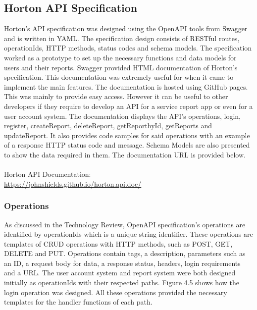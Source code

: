 \subsection{Horton API Specification}
Horton's API specification was designed using the OpenAPI tools from Swagger and is written in YAML. The specification design consists of RESTful routes, operationIds, HTTP methods, status codes and schema models. 
The specification worked as a prototype to set up the necessary functions and data models for users and their reports. 
Swagger provided HTML documentation of Horton's specification. This documentation was extremely useful for when it came to implement the main features. The documentation is hosted using GitHub pages. This was mainly to provide easy access. However it can be useful to other developers if they require to develop an API for a service report app or even for a user account system. The documentation displays the API's operations, login, register, createReport, deleteReport, getReportbyId, getReports and updateReport. It also provides code samples for said operations with an example of a response HTTP status code and message. Schema Models are also presented to show the data required in them. The documentation URL is provided below.
\\\\ Horton API Documentation: \\ 
\url{https://johnshields.github.io/horton.api.doc/}

\subsubsection{Operations}
As discussed in the Technology Review, OpenAPI specification's operations are identified by operationIds which is a unique string identifier. These operations are templates of CRUD operations with HTTP methods, such as POST, GET, DELETE and PUT. Operations contain tags, a description, parameters such as an ID, a request body for data, a response status, headers, login requirements and a URL. The user account system and report system were both designed initially as operationIds with their respected paths. Figure 4.5 shows how the login operation was designed. All these operations provided the necessary templates for the handler functions of each path.


